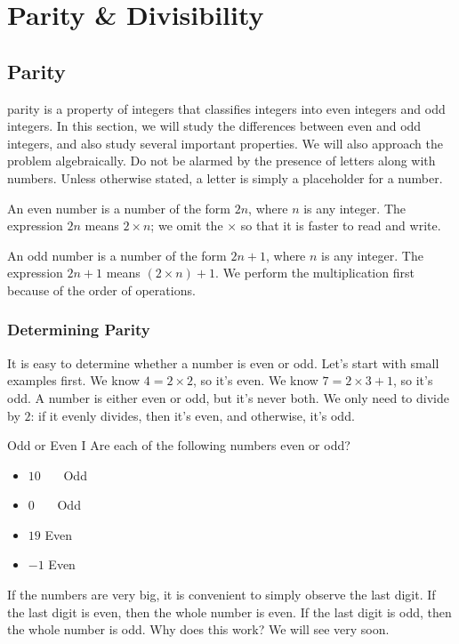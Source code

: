 \documentclass[a4paper,10pt]{report}
\begin{document}
\chapter{Parity \& Divisibility}

\section{Parity}

\Gls{parity} is a property of integers that classifies integers into even
integers and odd integers. In this section, we will study the differences
between even and odd integers, and also study several important properties. We
will also approach the problem algebraically. Do not be alarmed by the presence
of letters along with numbers. Unless otherwise stated, a letter is simply a
placeholder for a number.

An even number is a number of the form $2n$, where $n$ is any integer. The
expression $2n$ means $2\times n$; we omit the $\times$ so that it is faster to
read and write.

An odd number is a number of the form $2n+1$, where $n$ is any integer. The
expression $2n+1$ means $(2\times n) + 1$. We perform the multiplication first
because of the order of operations.

\subsection{Determining Parity}
It is easy to determine whether a number is even or odd. Let's start with small
examples first. We know $4=2\times2$, so it's even. We know $7=2\times3+1$, so
it's odd. A number is either even or odd, but it's never both. We only need to
divide by $2$: if it evenly divides, then it's even, and otherwise, it's odd.

\begin{problem}{Odd or Even I}
 Are each of the following numbers even or odd?

 \begin{itemize}
  \item $10$ \hfill {}~~~Odd
  \item $0$ \hfill {}~~~Odd
  \item $19$ \hfill Even~~~
  \item $-1$ \hfill Even~~~
 \end{itemize}
\end{problem}

If the numbers are very big, it is convenient to simply observe the last digit.
If the last digit is even, then the whole number is even. If the last digit is
odd, then the whole number is odd. Why does this work? We will see very soon.
\end{document}
